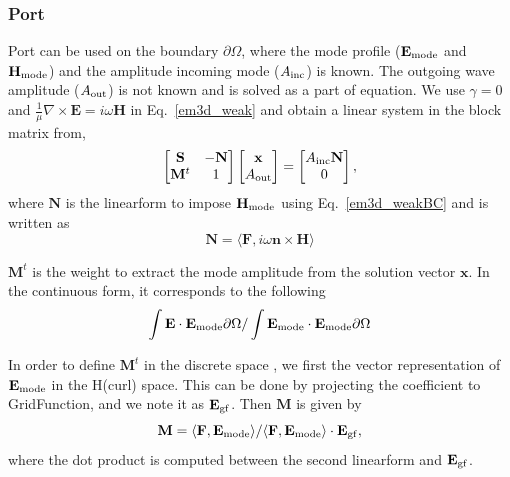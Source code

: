 \documentclass[11pt,a4paper,final]{report}
\begin{document}
 \subsubsection{Port}
 Port can be used  on the boundary $\partial\Omega$, where the mode profile ($\mathbf{E}_{\rm mode}$ and $\mathbf{H}_{\rm mode}$) and the amplitude incoming mode ($A_{\rm inc}$) is known. The outgoing wave amplitude ($A_{\rm out}$) is not known and is solved as a part of equation. We use $\gamma=0$ and $\frac{1}{\mu}\nabla\times\mathbf{E}=i \omega \mathbf{H}$ in Eq.~\ref{em3d_weak} and obtain a linear system in the block matrix from,
\begin{equation}
\label{port_BC_blockmatrix}
 \begin{bmatrix}
 \mathbf{S}   & -\mathbf{N} \\
\mathbf{M}^t & 1\\
\end{bmatrix}
 \begin{bmatrix}
 \mathbf{x} \\
A_{\rm out}\\
\end{bmatrix}
=
 \begin{bmatrix}
A_{\rm inc} \mathbf{N}     \\
0 \\
\end{bmatrix},
 \end{equation}
where $\mathbf{N}$ is the linearform to impose  $\mathbf{H}_{\rm mode}$ using Eq.~\ref{em3d_weakBC} and is written as
\begin{equation}
\mathbf{N} = \langle \mathbf{F}, i \omega \mathbf{n} \times \mathbf{H}\rangle 
 \end{equation}
 
$\mathbf{M}^t$ is the weight to extract the mode amplitude from the solution vector $\mathbf{x}$. In the continuous form, it corresponds to the following 
\begin{equation}
\int \mathbf{E} \cdot \mathbf{E}_{\rm mode} \partial\Omega/\int \mathbf{E}_{\rm mode}  \cdot \mathbf{E}_{\rm mode} \partial\Omega
\end{equation}

In order to define $\mathbf{M}^t$ in the discrete space , we first the vector representation of $\mathbf{E}_{\rm mode}$ in the H(curl) space. This can be done by projecting the coefficient to GridFunction, and we note it as $\mathbf{E}_{\rm gf}$. Then $\mathbf{M}$ is given by
\begin{equation}
\mathbf{M} = \langle \mathbf{F}, \mathbf{E_{\rm mode}} \rangle / \langle \mathbf{F}, \mathbf{E}_{\rm mode} \rangle \cdot \mathbf{E}_{\rm gf},
 \end{equation}
where the dot product is computed between the second linearform and $\mathbf{E}_{\rm gf}$.
\end{document}

